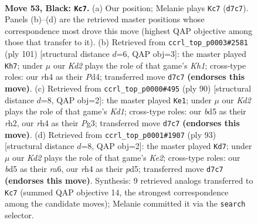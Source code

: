 \documentclass[11pt]{article}
\begin{document}
\clearpage

\begin{figure}[p]\centering
\begin{subfigure}{0.46\textwidth}\centering
\resizebox{\linewidth}{!}{%
\newchessgame
\chessboard[
  setfen={5r2/1P1k4/8/3B4/7R/4K3/8/8 b - - 0 53},
  showmover=false,
  pgfstyle=straightmove, color=movearrow, markmove={d7-c7}
]}
\caption{}
\end{subfigure}\hfill
\begin{subfigure}{0.46\textwidth}\centering
\resizebox{\linewidth}{!}{%
\newchessgame
\chessboard[
  setfen={7k/8/8/8/3p1B2/8/6rP/4K3 b - - 1 51},
  showmover=false,
  pgfstyle=straightmove, color=movearrow, markmove={h8-h7}
]}
\caption{}
\end{subfigure}
\\[4pt]
\begin{subfigure}{0.46\textwidth}\centering
\resizebox{\linewidth}{!}{%
\newchessgame
\chessboard[
  setfen={8/8/4k2p/R7/8/6P1/7r/3K4 w - - 0 46},
  showmover=false,
  pgfstyle=straightmove, color=movearrow, markmove={d1-e1}
]}
\caption{}
\end{subfigure}\hfill
\begin{subfigure}{0.46\textwidth}\centering
\resizebox{\linewidth}{!}{%
\newchessgame
\chessboard[
  setfen={8/4k3/R7/3P4/1r6/4K3/P7/8 b - - 4 47},
  showmover=false,
  pgfstyle=straightmove, color=movearrow, markmove={e7-d7}
]}
\caption{}
\end{subfigure}
\caption{\textbf{Move 53, Black: \texttt{Kc7}.} (a) Our position; Melanie plays \texttt{Kc7} (\texttt{d7c7}). Panels (b)--(d) are the retrieved master positions whose correspondence most drove this move (highest QAP objective among those that transfer to it). (b) Retrieved from \texttt{ccrl\_top\_p0003\#2581} (ply 101) [structural distance $d$=6, QAP obj=3]: the master played \texttt{Kh7}; under $\mu$ our \emph{Kd2} plays the role of that game's \emph{Kh1}; cross-type roles: our \emph{r}h4 as their \emph{P}d4; transferred move \texttt{d7c7} \textbf{(endorses this move)}. (c) Retrieved from \texttt{ccrl\_top\_p0000\#495} (ply 90) [structural distance $d$=8, QAP obj=2]: the master played \texttt{Ke1}; under $\mu$ our \emph{Kd2} plays the role of that game's \emph{Kd1}; cross-type roles: our \emph{b}d5 as their \emph{r}h2, our \emph{r}h4 as their \emph{P}g3; transferred move \texttt{d7c7} \textbf{(endorses this move)}. (d) Retrieved from \texttt{ccrl\_top\_p0001\#1907} (ply 93) [structural distance $d$=8, QAP obj=2]: the master played \texttt{Kd7}; under $\mu$ our \emph{Kd2} plays the role of that game's \emph{Ke2}; cross-type roles: our \emph{b}d5 as their \emph{r}a6, our \emph{r}h4 as their \emph{p}d5; transferred move \texttt{d7c7} \textbf{(endorses this move)}. Synthesis: 9 retrieved analogs transferred to \texttt{Kc7} (summed QAP objective 14, the strongest correspondence among the candidate moves); Melanie committed it via the \texttt{search} selector.}
\label{fig:thought-m105}
\end{figure}
\end{document}
